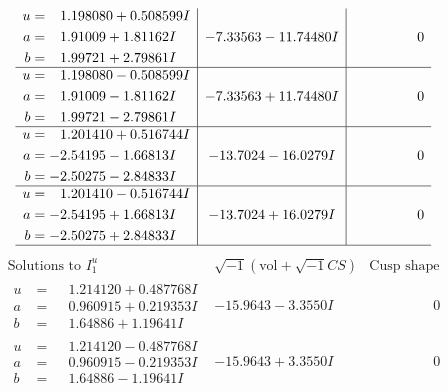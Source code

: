 \documentclass[1p]{elsarticle_modified}
\theoremstyle{definition}
\newcommand{\I}{\sqrt{-1}}
\begin{document}
$$\begin{array}{c|c|c}
\begin{aligned}
u &= \phantom{-}1.198080 + 0.508599 I \\
a &= \phantom{-}1.91009 + 1.81162 I \\
b &= \phantom{-}1.99721 + 2.79861 I\end{aligned}
 & -7.33563 - 11.74480 I & \phantom{-0.000000 } 0 \\ \hline\begin{aligned}
u &= \phantom{-}1.198080 - 0.508599 I \\
a &= \phantom{-}1.91009 - 1.81162 I \\
b &= \phantom{-}1.99721 - 2.79861 I\end{aligned}
 & -7.33563 + 11.74480 I & \phantom{-0.000000 } 0 \\ \hline\begin{aligned}
u &= \phantom{-}1.201410 + 0.516744 I \\
a &= -2.54195 - 1.66813 I \\
b &= -2.50275 - 2.84833 I\end{aligned}
 & -13.7024 - 16.0279 I & \phantom{-0.000000 } 0 \\ \hline\begin{aligned}
u &= \phantom{-}1.201410 - 0.516744 I \\
a &= -2.54195 + 1.66813 I \\
b &= -2.50275 + 2.84833 I\end{aligned}
 & -13.7024 + 16.0279 I & \phantom{-0.000000 } 0\\
 \hline 
 \end{array}$$\newpage$$\begin{array}{c|c|c}  
\text{Solutions to }I^u_{1}& \I (\text{vol} + \sqrt{-1}CS) & \text{Cusp shape}\\
 \hline 
\begin{aligned}
u &= \phantom{-}1.214120 + 0.487768 I \\
a &= \phantom{-}0.960915 + 0.219353 I \\
b &= \phantom{-}1.64886 + 1.19641 I\end{aligned}
 & -15.9643 - 3.3550 I & \phantom{-0.000000 } 0 \\ \hline\begin{aligned}
u &= \phantom{-}1.214120 - 0.487768 I \\
a &= \phantom{-}0.960915 - 0.219353 I \\
b &= \phantom{-}1.64886 - 1.19641 I\end{aligned}
 & -15.9643 + 3.3550 I & \phantom{-0.000000 } 0 \\ \hline\begin{aligned}

\end{aligned}
\end{array}$$
\end{document}
